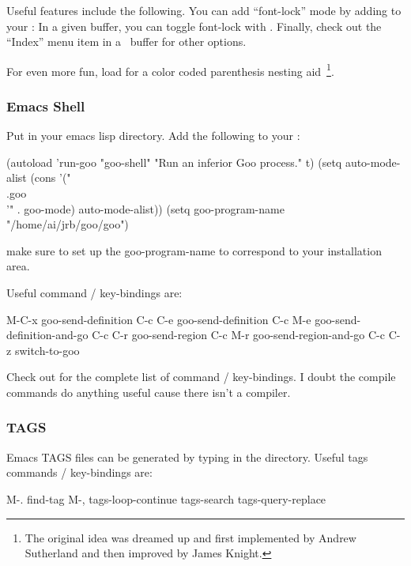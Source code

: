 \documentclass[twoside,twocolumn,9pt]{extarticle}
\begin{document}
Useful features include the following.
You can add ``font-lock'' mode by adding 
 to your :
In a given buffer, you can toggle font-lock with .
Finally, check out the ``Index'' menu item in a \goo\ buffer for other
options.

For even more fun, load  for a color
coded parenthesis nesting aid~\footnote{The original idea was dreamed
up and first implemented by Andrew Sutherland and then improved by
James Knight.}.

\subsubsection{Emacs Shell}

Put  in your emacs lisp directory.  Add the
following to your :

\begin{exv}
(autoload 'run-goo  "goo-shell" "Run an inferior Goo process." t)
(setq auto-mode-alist
      (cons '("\\.goo\\'" . goo-mode) auto-mode-alist))
(setq goo-program-name "/home/ai/jrb/goo/goo") 
\end{exv}

make sure to set up the goo-program-name to correspond to your
installation area.

Useful command / key-bindings are:

\begin{exv}
M-C-x   goo-send-definition
C-c C-e goo-send-definition
C-c M-e goo-send-definition-and-go
C-c C-r goo-send-region
C-c M-r goo-send-region-and-go
C-c C-z switch-to-goo
\end{exv}

Check out  for the complete list of command /
key-bindings. I doubt the compile commands do anything useful cause
there isn't a compiler.

\subsubsection{TAGS}

Emacs TAGS files can be generated by typing  in
the  directory.  Useful tags commands / key-bindings are:

\begin{exv}
M-.     find-tag
M-,     tags-loop-continue
        tags-search
        tags-query-replace
\end{exv}
\end{document}
